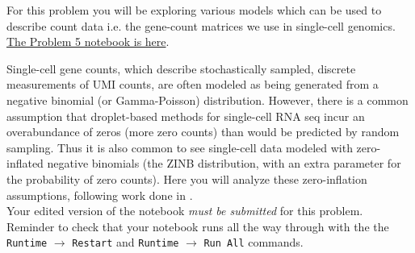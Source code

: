 \documentclass[11pt]{exam}
\begin{document}
\begin{questions}
 \question[40] For this problem you will be exploring various models which can be used to describe count data i.e. the gene-count matrices we use in single-cell genomics. \href{https://github.com/pachterlab/BI-BE-CS-183-2023/blob/main/HW5/Problem5.ipynb}{The Problem 5 notebook is here}.

    Single-cell gene counts, which describe stochastically sampled, discrete measurements of UMI counts, are often modeled as being generated from a negative binomial (or Gamma-Poisson) distribution. However, there is a common assumption that droplet-based methods for single-cell RNA seq incur an overabundance of zeros (more zero counts) than would be predicted by random sampling. Thus it is also common to see single-cell data modeled with zero-inflated negative binomials (the ZINB distribution, with an extra parameter for the probability of zero counts). Here you will analyze these zero-inflation assumptions, following work done in \cite{Svensson2020-vw}. \\

    Your edited version of the notebook \textit{must be submitted } for this problem. Reminder to check that your notebook runs all the way through with the the {\tt Runtime} $\xrightarrow{}$ {\tt Restart} and {\tt Runtime} $\xrightarrow{}$ {\tt Run All} commands.
  

\end{questions}
\end{document}
